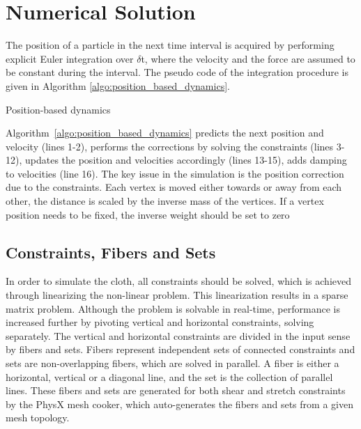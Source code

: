 \section{Numerical Solution}
\label{section_numerical_solution}
The position of a particle in the next time interval is acquired by performing explicit Euler integration over $\delta$t, where the velocity and the force are assumed to be constant during the interval. The pseudo code of the integration procedure is given in Algorithm \ref{algo:position_based_dynamics}.

\begin{algorithm}[ht]
\DontPrintSemicolon %
\caption{Position-based dynamics}
\label{algo:position_based_dynamics}
\end{algorithm}

Algorithm~\ref{algo:position_based_dynamics} predicts the next position and velocity (lines 1-2), performs the corrections by solving the constraints (lines 3-12), updates the position and velocities accordingly (lines 13-15), adds damping to velocities (line 16). The key issue in the simulation is the position correction due to the constraints. Each vertex is moved either towards or away from each other, the distance is scaled by the inverse mass of the vertices. If a vertex position needs to be fixed, the inverse weight should be set to zero

\subsection{Constraints, Fibers and Sets}
In order to simulate the cloth, all constraints should be solved, which is achieved through linearizing the non-linear problem. This linearization results in a sparse matrix problem. Although the problem is solvable in real-time, performance is increased further by pivoting vertical and horizontal constraints, solving separately. The vertical and horizontal constraints are divided in the input sense by fibers and sets. Fibers represent independent sets of connected constraints and sets are non-overlapping fibers, which are solved in parallel. A fiber is either a horizontal, vertical or a diagonal line, and the set is the collection of parallel lines. These fibers and sets are generated for both shear and stretch constraints by the PhysX mesh cooker, which auto-generates the fibers and sets from a given mesh topology. 

